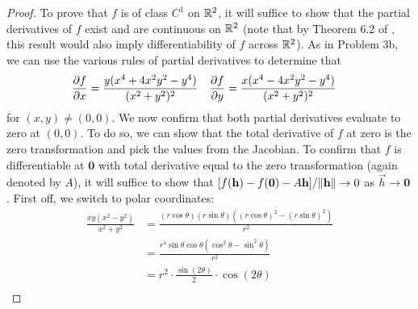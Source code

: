 \documentclass[../psets.tex]{subfiles}
\begin{document}
\begin{enumerate}
\begin{enumerate}
\begin{proof}


            To prove that $f$ is of class $C^1$ on $\mathbb{R}^2$, it will suffice to show that the partial derivatives of $f$ exist and are continuous on $\mathbb{R}^2$ (note that by Theorem 6.2 of \textcite{bib:Munkres}, this result would also imply differentiability of $f$ across $\mathbb{R}^2$). As in Problem 3b, we can use the various rules of partial derivatives to determine that
            \begin{align*}
                \pdv{f}{x} &= \frac{y(x^4+4x^2y^2-y^4)}{(x^2+y^2)^2}&
                \pdv{f}{y} &= \frac{x(x^4-4x^2y^2-y^4)}{(x^2+y^2)^2}
            \end{align*}
            for $(x,y)\neq(0,0)$. We now confirm that both partial derivatives evaluate to zero at $(0,0)$. To do so, we can show that the total derivative of $f$ at zero is the zero transformation and pick the values from the Jacobian. To confirm that $f$ is differentiable at $\bm{0}$ with total derivative equal to the zero transformation (again denoted by $A$), it will suffice to show that $[f(\mathbf{h})-f(\bm{0})-A\mathbf{h}]/\norm{\mathbf{h}}\to 0$ as $\vec{h}\to\bm{0}$. First off, we switch to polar coordinates:
            \begin{align*}
                \frac{xy(x^2-y^2)}{x^2+y^2} &= \frac{(r\cos\theta)(r\sin\theta)((r\cos\theta)^2-(r\sin\theta)^2)}{r^2}\\
                &= \frac{r^4\sin\theta\cos\theta(\cos^2\theta-\sin^2\theta)}{r^2}\\
                &= r^2\cdot\frac{\sin(2\theta)}{2}\cdot\cos(2\theta)\\

\end{align*}
\end{proof}
\end{enumerate}
\end{enumerate}
\end{document}
